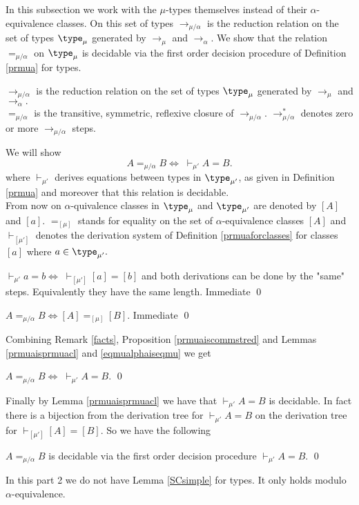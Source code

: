 \documentclass[11pt,aslarticle,xperspectives,bibay3]{asl}
\newcommand\redalpha{\mathrel{\rightarrow_{\alpha}}}
\newcommand\redmu{\mathrel{\rightarrow_{\mu}}}
\newcommand\redmualpha{\mathrel{\rightarrow_{\mu/\alpha}}}
\newcommand\redmualphastar{\mathrel{\rightarrow^{\ast}_{\mu/\alpha}}}
\newcommand\tamua{\type_{\mu'}}
\newcommand\prmua{\vdash_{\mu'}}
\newcommand\prmuacl{\vdash_{[\mu']}}
\newcommand\weakmualphaeq{=_{\mu/\alpha}}
\newcommand\weakeqcl{=_{[\mu]}}
\begin{document}
{In this subsection we work with the $\mu$-types themselves instead of their $\alpha$-equivalence classes. On this set of types $\redmualpha$ is the reduction relation on the set of types $\tamu$ generated by $\redmu$ and $\redalpha$. We show that the relation $\weakmualphaeq$ on $\tamu$ is decidable via the first order decision procedure of Definition \ref{prmua} for types.

\bdf $\redmualpha$ is the reduction relation on the set of types $\tamu$ generated by $\redmu$ and $\redalpha.$\\ $\weakmualphaeq$ is the transitive, symmetric, reflexive closure of $\redmualpha.$
 $\redmualphastar$ denotes zero or more $\redmualpha$ steps.
\edf

We will show 
$$A\weakmualphaeq B \Leftrightarrow \;\prmua A=B.$$
where $\prmua$ derives equations between types in $\tamua$, as given in Definition \ref{prmua} and moreover that this relation is decidable.\\
From now on  $\alpha$-quivalence classes in $\tamu$ and $\tamua$ are denoted by $[A]$ and $[a].$ $\weakeqcl$ stands for equality on the set  of $\alpha$-equivalence classes $[A]$ and 
$\prmuacl$ denotes the derivation system of Definition \ref{prmuaforclasses} for classes $[a]$ where $a\in\tamua.$

\blem\label{prmuaisprmuacl} $\prmua a=b \Leftrightarrow \;\prmuacl [a]=[b]$ and both derivations can be done by the "same" steps. Equivalently they have the same length.
\elem
\bpf Immediate \qed
\epf

\blem\label{eqmualphaiseqmu} $A\weakmualphaeq B \Leftrightarrow [A]\weakeqcl [B].$
\elem
\bpf Immediate \qed
\epf

Combining Remark \ref{facts}, Proposition \ref{prmuaiscommstred} and Lemmas \ref{prmuaisprmuacl} and \ref{eqmualphaiseqmu} we get

\bcor  $A\weakmualphaeq B \Leftrightarrow \;\prmua A=B.$ \qed
\ecor

Finally by Lemma \ref{prmuaisprmuacl} we have that $\prmua A=B$ is decidable. In fact there is a bijection from the derivation tree for $\prmua A=B$ on the derivation tree for $\prmuacl [A]= [B].$ So we have the following

\bth $A\weakmualphaeq B$ is decidable via the first order decision procedure $\prmua A=B.$ \qed
\eth

\brem In this part 2 we do not have Lemma \ref{SCsimple} for types. It only holds modulo $\alpha$-equivalence.
\erem

}
\end{document}

